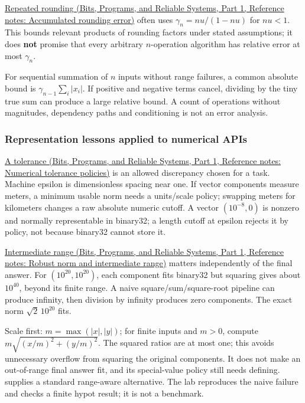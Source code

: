 \href{../01-Bits-Programs-and-Reliable-Systems-P01/main.pdf\#appendix-f82e270791c8}{Repeated rounding (Bits, Programs, and Reliable Systems, Part 1, Reference notes: Accumulated rounding error)} often uses \(\gamma_n=nu/(1-nu)\) for \(nu<1\). This bounds relevant products of rounding factors under stated assumptions; it does \textbf{not} promise that every arbitrary \(n\)-operation algorithm has relative error at most \(\gamma_n\).

For sequential summation of \(n\) inputs without range failures, a common absolute bound is \(\gamma_{n-1}\sum_i|x_i|\). If positive and negative terms cancel, dividing by the tiny true sum can produce a large relative bound. A count of operations without magnitudes, dependency paths and conditioning is not an error analysis.

\subsubsection{Representation lessons applied to numerical APIs}\label{05-engine-i-ch001-representation-lessons-applied-to-numerical-apis}

\hypertarget{05-engine-i-ch001-representation-lessons-applied-to-numerical-apis}{}

\href{../01-Bits-Programs-and-Reliable-Systems-P01/main.pdf\#appendix-0ec599f8ba27}{A tolerance (Bits, Programs, and Reliable Systems, Part 1, Reference notes: Numerical tolerance policies)} is an allowed discrepancy chosen for a task. Machine epsilon is dimensionless spacing near one. If vector components measure meters, a minimum usable norm needs a units/scale policy; swapping meters for kilometers changes a raw absolute numeric cutoff. A vector \((10^{-8},0)\) is nonzero and normally representable in binary32; a length cutoff at epsilon rejects it by policy, not because binary32 cannot store it.

\href{../01-Bits-Programs-and-Reliable-Systems-P01/main.pdf\#appendix-7f1e17dcafb1}{Intermediate range (Bits, Programs, and Reliable Systems, Part 1, Reference notes: Robust norm and intermediate range)} matters independently of the final answer. For \((10^{20},10^{20})\), each component fits binary32 but squaring gives about \(10^{40}\), beyond its finite range. A naive square/sum/square-root pipeline can produce infinity, then division by infinity produces zero components. The exact norm \(\sqrt2\,10^{20}\) fits.

Scale first: \(m=\max(|x|,|y|)\); for finite inputs and \(m>0\), compute \(m\sqrt{(x/m)^2+(y/m)^2}\). The squared ratios are at most one; this avoids unnecessary overflow from squaring the original components. It does not make an out-of-range final answer fit, and its special-value policy still needs defining.  supplies a standard range-aware alternative. The lab reproduces the naive failure and checks a finite hypot result; it is not a benchmark.

